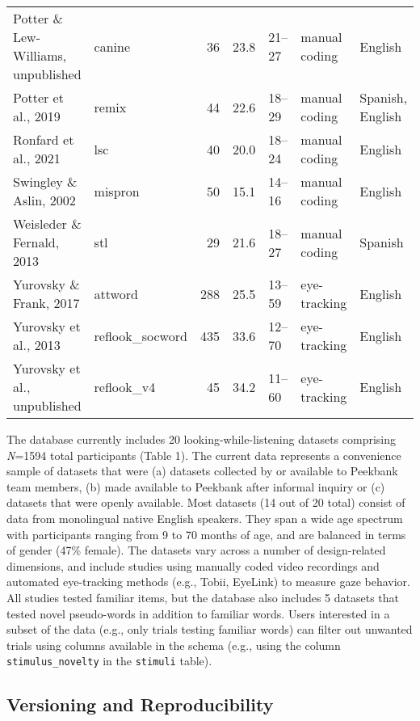 \documentclass[
  english,
  man,floatsintext]{apa6}
\begin{document}
\begin{table}
{\begin{tabular}[t]{llrrlll}
Potter \& Lew-Williams, unpublished & canine & 36 & 23.8 & 21–27 & manual coding & English\\
Potter et al., 2019 & remix & 44 & 22.6 & 18–29 & manual coding & Spanish, English\\
Ronfard et al., 2021 & lsc & 40 & 20.0 & 18–24 & manual coding & English\\
Swingley \& Aslin, 2002 & mispron & 50 & 15.1 & 14–16 & manual coding & English\\
Weisleder \& Fernald, 2013 & stl & 29 & 21.6 & 18–27 & manual coding & Spanish\\
Yurovsky \& Frank, 2017 & attword & 288 & 25.5 & 13–59 & eye-tracking & English\\
Yurovsky et al., 2013 & reflook\_socword & 435 & 33.6 & 12–70 & eye-tracking & English\\
Yurovsky et al., unpublished & reflook\_v4 & 45 & 34.2 & 11–60 & eye-tracking & English\\
\bottomrule
\end{tabular}}
\end{table}

The database currently includes 20 looking-while-listening datasets comprising \emph{N}=1594 total participants (Table 1).
The current data represents a convenience sample of datasets that were (a) datasets collected by or available to Peekbank team members, (b) made available to Peekbank after informal inquiry or (c) datasets that were openly available.
Most datasets (14 out of 20 total) consist of data from monolingual native English speakers.
They span a wide age spectrum with participants ranging from 9 to 70 months of age, and are balanced in terms of gender (47\% female).
The datasets vary across a number of design-related dimensions, and include studies using manually coded video recordings and automated eye-tracking methods (e.g., Tobii, EyeLink) to measure gaze behavior.
All studies tested familiar items, but the database also includes 5 datasets that tested novel pseudo-words in addition to familiar words.
Users interested in a subset of the data (e.g., only trials testing familiar words) can filter out unwanted trials using columns available in the schema (e.g., using the column \texttt{stimulus\_novelty} in the \texttt{stimuli} table).

\hypertarget{versioning-and-reproducibility}{%
\subsection{Versioning and Reproducibility}\label{versioning-and-reproducibility}}
\end{document}
